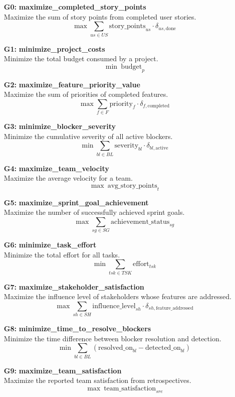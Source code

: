 \documentclass[11pt, a4paper]{article}
\begin{document}
\begin{itemize}
    \item[\textbf{G0:}] \textbf{maximize\_completed\_story\_points} \\
    Maximize the sum of story points from completed user stories.
    $$ \max \sum_{us \in US} \text{story\_points}_{us} \cdot \delta_{us, \text{done}} $$
    \item[\textbf{G1:}] \textbf{minimize\_project\_costs} \\
    Minimize the total budget consumed by a project.
    $$ \min \: \text{budget}_{p} $$
    \item[\textbf{G2:}] \textbf{maximize\_feature\_priority\_value} \\
    Maximize the sum of priorities of completed features.
    $$ \max \sum_{f \in F} \text{priority}_{f} \cdot \delta_{f, \text{completed}} $$
    \item[\textbf{G3:}] \textbf{minimize\_blocker\_severity} \\
    Minimize the cumulative severity of all active blockers.
    $$ \min \sum_{bl \in BL} \text{severity}_{bl} \cdot \delta_{bl, \text{active}} $$
    \item[\textbf{G4:}] \textbf{maximize\_team\_velocity} \\
    Maximize the average velocity for a team.
    $$ \max \: \text{avg\_story\_points}_{t} $$
    \item[\textbf{G5:}] \textbf{maximize\_sprint\_goal\_achievement} \\
    Maximize the number of successfully achieved sprint goals.
    $$ \max \sum_{sg \in SG} \text{achievement\_status}_{sg} $$
    \item[\textbf{G6:}] \textbf{minimize\_task\_effort} \\
    Minimize the total effort for all tasks.
    $$ \min \sum_{tsk \in TSK} \text{effort}_{tsk} $$
    \item[\textbf{G7:}] \textbf{maximize\_stakeholder\_satisfaction} \\
    Maximize the influence level of stakeholders whose features are addressed.
    $$ \max \sum_{sh \in SH} \text{influence\_level}_{sh} \cdot \delta_{sh, \text{feature\_addressed}} $$
    \item[\textbf{G8:}] \textbf{minimize\_time\_to\_resolve\_blockers} \\
    Minimize the time difference between blocker resolution and detection.
    $$ \min \sum_{bl \in BL} (\text{resolved\_on}_{bl} - \text{detected\_on}_{bl}) $$
    \item[\textbf{G9:}] \textbf{maximize\_team\_satisfaction} \\
    Maximize the reported team satisfaction from retrospectives.
    $$ \max \: \text{team\_satisfaction}_{sre} $$
\end{itemize}
\end{document}
